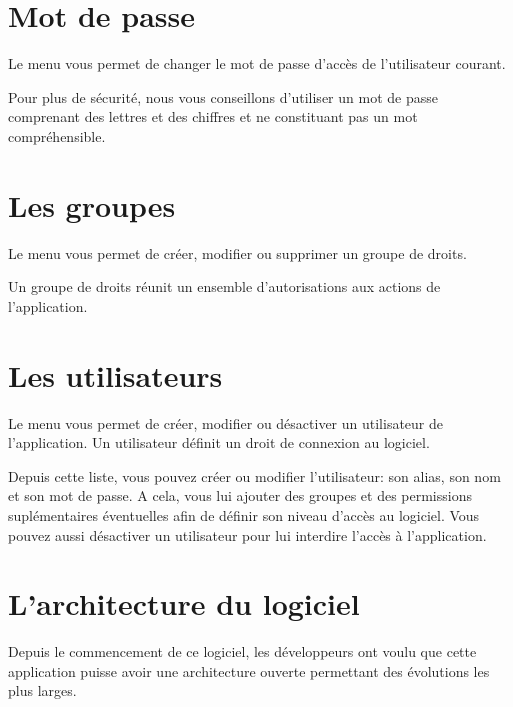 \documentclass[letterpaper,10pt,french]{sphinxmanual}
\begin{document}
\section{Mot de passe}
\label{\detokenize{CORE/password:mot-de-passe}}\label{\detokenize{CORE/password::doc}}
Le menu  vous permet de changer le mot de passe d’accès de l’utilisateur courant.

\noindent{}

Pour plus de sécurité, nous vous conseillons d’utiliser un mot de passe comprenant des lettres et des chiffres et ne constituant pas un mot compréhensible.


\section{Les groupes}
\label{\detokenize{CORE/groups:les-groupes}}\label{\detokenize{CORE/groups::doc}}
Le menu  vous permet de créer, modifier ou supprimer un groupe de droits.

\noindent{}

Un groupe de droits réunit un ensemble d’autorisations aux actions de l’application.

\noindent{}


\section{Les utilisateurs}
\label{\detokenize{CORE/users:les-utilisateurs}}\label{\detokenize{CORE/users::doc}}
Le menu  vous
permet de créer, modifier ou désactiver un utilisateur de l’application. Un
utilisateur définit un droit de connexion au logiciel.

\noindent{}

Depuis cette liste, vous pouvez créer ou modifier l’utilisateur: son
alias, son nom et son mot de passe. A cela, vous lui ajouter des groupes et
des permissions suplémentaires éventuelles afin de définir son niveau
d’accès au logiciel. Vous pouvez aussi désactiver un utilisateur pour lui
interdire l’accès à l’application.

\noindent{}

\noindent{}


\section{L’architecture du logiciel}
\label{\detokenize{CORE/architecture::doc}}\label{\detokenize{CORE/architecture:l-architecture-du-logiciel}}
Depuis le commencement de ce logiciel, les développeurs ont voulu que cette application puisse avoir une architecture ouverte permettant des évolutions les plus larges.



\renewcommand{\indexname}{Index}
\printindex
\end{document}
